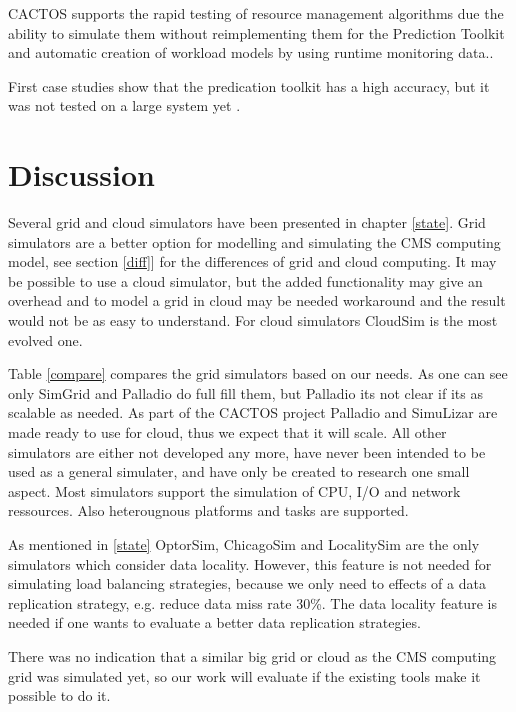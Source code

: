 CACTOS supports the rapid testing of resource management algorithms due the ability to simulate them without reimplementing them for the Prediction Toolkit and automatic creation of workload models by using runtime monitoring data.\cite{rapidtesting}. 

First case studies show that the predication toolkit has a high accuracy, but it was not tested on a large system yet \cite{rapidtesting}.




\chapter{Discussion}
\label{dis}
Several grid and cloud simulators have been presented in chapter \ref{state}. Grid simulators are a better option for modelling and simulating the CMS computing model, see section \ref{diff}] for the differences of grid and cloud computing. It may be possible to use a cloud simulator, but the added functionality may give an overhead and to model a grid in cloud may be needed workaround and the result would not be as easy to understand. For cloud simulators CloudSim is the most evolved one.

Table \ref{compare} compares the grid simulators based on our needs. As one can see only SimGrid and Palladio do full fill them, but Palladio its not clear if its as scalable as needed.  As part of the CACTOS project Palladio and SimuLizar are made ready to use for cloud, thus we expect that it will scale. All other simulators are either not developed any more, have never been intended to be used as a general simulater, and have only be created to research one small aspect. Most simulators support the simulation of CPU, I/O and network ressources. Also heterougnous platforms and tasks are supported.

As mentioned in \ref{state} OptorSim, ChicagoSim and LocalitySim are the only simulators which consider data locality. However, this feature is not needed for simulating load balancing strategies, because we only need to effects of a data replication strategy, e.g. reduce data miss rate 30\%. The data locality feature is needed if one wants to evaluate a better data replication strategies. 

There was no indication that a similar big grid or cloud as the CMS computing grid was simulated yet, so our work will evaluate if the existing tools make it possible to do it.


